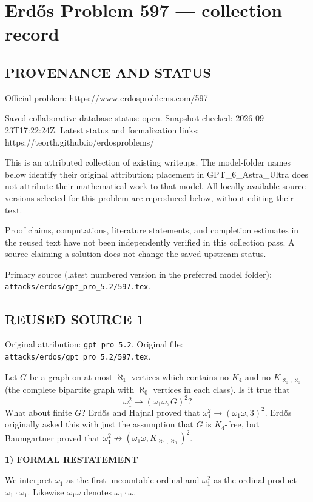 \section*{Erd\H{o}s Problem 597 --- collection record}

\subsection*{PROVENANCE AND STATUS}
Official problem: https://www.erdosproblems.com/597

Saved collaborative-database status: open.
Snapshot checked: 2026-09-23T17:22:24Z.
Latest status and formalization links: https://teorth.github.io/erdosproblems/

This is an attributed collection of existing writeups. The model-folder names below identify their original attribution; placement in GPT\_6\_Astra\_Ultra does not attribute their mathematical work to that model. All locally available source versions selected for this problem are reproduced below, without editing their text.

Proof claims, computations, literature statements, and completion estimates in the reused text have not been independently verified in this collection pass. A source claiming a solution does not change the saved upstream status.

Primary source (latest numbered version in the preferred model folder): \texttt{attacks/erdos/gpt\_pro\_5.2/597.tex}.

\subsection*{REUSED SOURCE 1}
Original attribution: \texttt{gpt\_pro\_5.2}.
Original file: \texttt{attacks/erdos/gpt\_pro\_5.2/597.tex}.



Let $G$ be a graph on at most $\aleph_1$ vertices which contains no $K_4$ and no $K_{\aleph_0,\aleph_0}$ (the complete bipartite graph with $\aleph_0$ vertices in each class). Is it true that\[\omega_1^2 \to (\omega_1\omega, G)^2?\]
What about finite $G$? Erd\H{o}s and Hajnal proved that $\omega_1^2 \to (\omega_1\omega,3)^2$. Erd\H{o}s originally asked this with just the assumption that $G$ is $K_4$-free, but Baumgartner proved that $\omega_1^2 \not\to (\omega_1\omega, K_{\aleph_0,\aleph_0})^2$.

\noindent\textbf{1) FORMAL RESTATEMENT}\par
We interpret $\omega_1$ as the first uncountable ordinal and $\omega_1^2$ as the ordinal product $\omega_1\cdot\omega_1$. Likewise $\omega_1\omega$ denotes $\omega_1\cdot\omega$.

